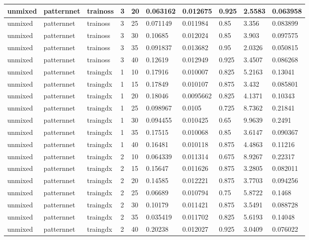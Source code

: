 \begin{longtable}{lllllllll}
unmixed & patternnet & trainoss & 3 & 20 & 0.063162 & 0.012675 & 0.925 & 2.5583 & 0.063958 \\ \hline 
unmixed & patternnet & trainoss & 3 & 25 & 0.071149 & 0.011984 & 0.85 & 3.356 & 0.083899 \\ \hline 
unmixed & patternnet & trainoss & 3 & 30 & 0.10685 & 0.012024 & 0.85 & 3.903 & 0.097575 \\ \hline 
unmixed & patternnet & trainoss & 3 & 35 & 0.091837 & 0.013682 & 0.95 & 2.0326 & 0.050815 \\ \hline 
unmixed & patternnet & trainoss & 3 & 40 & 0.12619 & 0.012949 & 0.925 & 3.4507 & 0.086268 \\ \hline 
unmixed & patternnet & traingdx & 1 & 10 & 0.17916 & 0.010007 & 0.825 & 5.2163 & 0.13041 \\ \hline 
unmixed & patternnet & traingdx & 1 & 15 & 0.17849 & 0.010107 & 0.875 & 3.432 & 0.085801 \\ \hline 
unmixed & patternnet & traingdx & 1 & 20 & 0.18046 & 0.0095662 & 0.825 & 4.1371 & 0.10343 \\ \hline 
unmixed & patternnet & traingdx & 1 & 25 & 0.098967 & 0.0105 & 0.725 & 8.7362 & 0.21841 \\ \hline 
unmixed & patternnet & traingdx & 1 & 30 & 0.094455 & 0.010425 & 0.65 & 9.9639 & 0.2491 \\ \hline 
unmixed & patternnet & traingdx & 1 & 35 & 0.17515 & 0.010068 & 0.85 & 3.6147 & 0.090367 \\ \hline 
unmixed & patternnet & traingdx & 1 & 40 & 0.16481 & 0.010118 & 0.875 & 4.4863 & 0.11216 \\ \hline 
unmixed & patternnet & traingdx & 2 & 10 & 0.064339 & 0.011314 & 0.675 & 8.9267 & 0.22317 \\ \hline 
unmixed & patternnet & traingdx & 2 & 15 & 0.15647 & 0.011626 & 0.875 & 3.2805 & 0.082011 \\ \hline 
unmixed & patternnet & traingdx & 2 & 20 & 0.14585 & 0.012221 & 0.875 & 3.7703 & 0.094256 \\ \hline 
unmixed & patternnet & traingdx & 2 & 25 & 0.06689 & 0.010794 & 0.75 & 5.8722 & 0.1468 \\ \hline 
unmixed & patternnet & traingdx & 2 & 30 & 0.10179 & 0.011421 & 0.875 & 3.5491 & 0.088728 \\ \hline 
unmixed & patternnet & traingdx & 2 & 35 & 0.035419 & 0.011702 & 0.825 & 5.6193 & 0.14048 \\ \hline 
unmixed & patternnet & traingdx & 2 & 40 & 0.20238 & 0.012027 & 0.925 & 3.0409 & 0.076022 \\ \hline 

\end{longtable}
